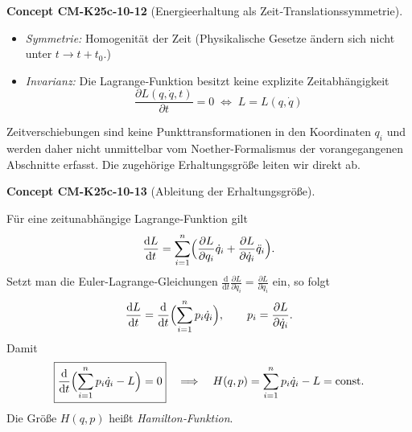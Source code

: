 \documentclass[10pt, letterpaper]{article}
\newcommand{\CustomHeading}[3]{%
  \par\medskip\noindent%
  \textbf{#1 #2} \textnormal{(#3)}.\enskip%
}
\newenvironment{CONC}[2]{\CustomHeading{Concept}{#1}{#2}}{}
\begin{document}
\begin{CONC}{CM-K25c-10-12}{Energieerhaltung als Zeit‐Translationssymmetrie}
\begin{itemize}
\item \emph{Symmetrie:} Homogenität der Zeit  
      (Physikalische Gesetze ändern sich nicht unter
      $t\!\to\!t+t_0$.)
\item \emph{Invarianz:} Die Lagrange‐Funktion besitzt keine
      explizite Zeitabhängigkeit
      \[
        \boxed{\;
          \frac{\partial L(q,\dot q,t)}{\partial t}=0
          \;\Longleftrightarrow\;
          L=L(q,\dot q)
        \;}
      \]
\end{itemize}

Zeitverschiebungen sind keine Punkttransformationen in den
Koordinaten $q_i$ und werden daher nicht unmittelbar vom
Noether-Formalismus der vorangegangenen Abschnitte erfasst.  
Die zugehörige Erhaltungsgröße leiten wir direkt ab.
\end{CONC}

\begin{CONC}{CM-K25c-10-13}{Ableitung der Erhaltungsgröße}
Für eine zeitunabhängige Lagrange‐Funktion gilt
\[
  \frac{\mathrm dL}{\mathrm dt}
  =\sum_{i=1}^{n}
     \Bigl(
       \frac{\partial L}{\partial q_i}\dot q_i
      +\frac{\partial L}{\partial\dot q_i}\ddot q_i
     \Bigr).
\]
Setzt man die Euler-Lagrange‐Gleichungen
$\tfrac{\mathrm d}{\mathrm dt}\tfrac{\partial L}{\partial\dot q_i}
 =\tfrac{\partial L}{\partial q_i}$ ein, so folgt
\[
  \frac{\mathrm dL}{\mathrm dt}
  =\frac{\mathrm d}{\mathrm dt}
     \Bigl(
       \sum_{i=1}^{n}p_i\dot q_i
     \Bigr),
  \qquad
  p_i=\frac{\partial L}{\partial\dot q_i}.
\]
Damit
\[
  \boxed{%
    \frac{\mathrm d}{\mathrm dt}
    \Bigl(
      \sum_{i=1}^{n}p_i\dot q_i - L
    \Bigr)=0
  }
  \quad\Longrightarrow\quad
  H(q,p)=\sum_{i=1}^{n}p_i\dot q_i-L=\text{const.}
\]
Die Größe
\(H(q,p)\) heißt \emph{Hamilton‐Funktion}.
\end{CONC}
\end{document}
